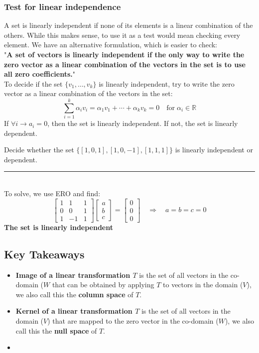 \documentclass[a4paper, 9pt]{extarticle}
\begin{document}
\subsubsection{Test for linear independence}
A set is linearly independent if none of its elements is a linear combination of the others.  While this makes sense, to use it as a test would mean checking every element. We have an alternative formulation, which is easier to check: \\[2ex]
"\textbf{A set of vectors is linearly independent if the only way to write the zero vector as a linear combination of the vectors in the set is to use all zero coefficients.}" \\[2ex]
To decide if the set $\{v_1, \dots, v_k\}$ is linearly independent, try to write the zero vector as a linear combination of the vectors in the set:
$$
  \sum_{i=1}^k \alpha_i v_i = \alpha_1 v_1 + \cdots + \alpha_k v_k = 0 \quad \text{for} \; \alpha_i \in \mathbb{R}
$$
If $\forall i \rightarrow a_i = 0$, then the set is linearly independent. If not, the set is linearly dependent.
\begin{examplebox}{}{}
  Decide whether the set $\{[1,0,1], [1,0,-1], [1,1,1]\}$ is linearly independent or dependent. \\
  \rule{\textwidth}{1px} \\
  To solve, we use ERO and find:
  $$
    \begin{bmatrix}
      1 & 1  & 1 \\
      0 & 0  & 1 \\
      1 & -1 & 1
    \end{bmatrix}
    \begin{bmatrix}
      a \\
      b \\
      c
    \end{bmatrix}
    =
    \begin{bmatrix}
      0 \\
      0 \\
      0
    \end{bmatrix}
    \quad \Rightarrow \quad
    a = b = c = 0
  $$
  \textbf{The set is linearly independent}
\end{examplebox}
\subsection{Key Takeaways}
\begin{takeaway-box}{}{}
\begin{itemize}
  \item \textbf{Image of a linear transformation $T$} is the set of all vectors in the co-domain ($W$ that can be obtained by applying $T$ to vectors in the domain ($V$), we also call this the \textbf{column space} of $T$.
  \item \textbf{Kernel of a linear transformation $T$} is the set of all vectors in the domain ($V$) that are mapped to the zero vector in the co-domain ($W$), we also call this the \textbf{null space} of $T$.
  \item \textbf{}
\end{itemize}
\end{takeaway-box}
\end{document}
